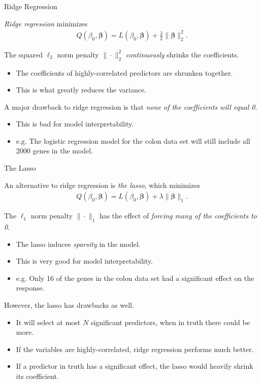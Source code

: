 \documentclass[8pt]{beamer}
\newcommand{\mys}{\vspace{0.5cm} %
}
\newcommand{\mysa}{\vspace{0.2cm} %
}
\begin{document}
\begin{frame}{\color{white} Ridge Regression}

\textit{Ridge regression} minimizes 
\begin{align}
    \label{ridge regression}
    Q(\beta_0, \bm{\beta}) = L(\beta_0, \bm{\beta}) + \frac{\lambda}{2} \| \bm{\beta} \|_2^2.
\end{align} \mysa

The squared $\ell_2$ norm penalty $\| \cdot \|_2^2$ \textit{continuously} shrinks the coefficients.
\begin{itemize}
    \item The coefficients of highly-correlated predictors are shrunken together.
    \item This is what greatly reduces the variance.
\end{itemize} \mys

A major drawback to ridge regression is that \textit{none of the coefficients will equal 0}.
\begin{itemize}
    \item This is bad for model interpretability.
    \item e.g. The logistic regression model for the colon data set will still include all 2000 genes in the model.
\end{itemize}
    
\end{frame}

\begin{frame}{\color{white} The Lasso}

An alternative to ridge regression is \textit{the lasso}, which minimizes 
\begin{align}
    \label{lasso}
    Q(\beta_0, \bm{\beta}) = L(\beta_0, \bm{\beta}) + \lambda \| \bm{\beta} \|_1.
\end{align} \mysa

The $\ell_1$ norm penalty $\| \cdot \|_1$ has the effect of \textit{forcing many of the coefficients to 0}.
\begin{itemize}
    \item The lasso induces \textit{sparsity} in the model. %
    \item This is very good for model interpretability.
    \item e.g. Only 16 of the genes in the colon data set had a significant effect on the response.
\end{itemize} \mys

However, the lasso has drawbacks as well.
\begin{itemize}
    \item It will select at most $N$ significant predictors, when in truth there could be more.
    \item If the variables are highly-correlated, ridge regression performs much better.
    \item If a predictor in truth has a significant effect, the lasso would heavily shrink its coefficient.
\end{itemize}
    
\end{frame}
\end{document}
